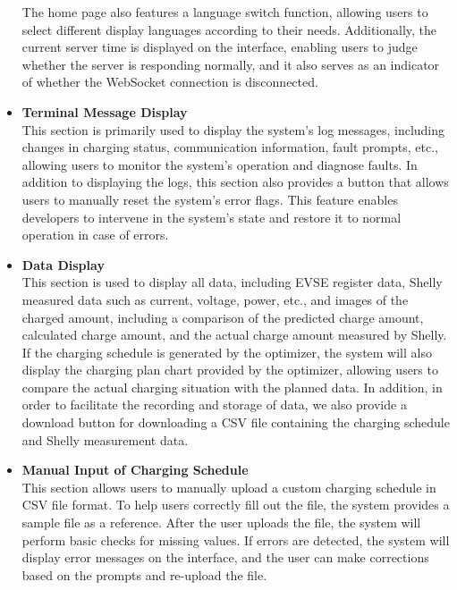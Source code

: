 \documentclass[
	english,
	ruledheaders=section,%
	class=report,%
	thesis={type=Report},%
	accentcolor=9c,%
	custommargins=true,%
	marginpar=false,%
	parskip=half-,%
	fontsize=11pt,%
	logofile={img/tuda_logo.pdf}, %
]{tudapub}
\begin{document}
\begin{itemize}
The home page also features a language switch function, allowing users to select different display languages according to their needs. Additionally, the current server time is displayed on the interface, enabling users to judge whether the server is responding normally, and it also serves as an indicator of whether the WebSocket connection is disconnected.

    \item \textbf{Terminal Message Display}\\
    This section is primarily used to display the system's log messages, including changes in charging status, communication information, fault prompts, etc., allowing users to monitor the system's operation and diagnose faults. In addition to displaying the logs, this section also provides a button that allows users to manually reset the system's error flags. This feature enables developers to intervene in the system's state and restore it to normal operation in case of errors.
    \item \textbf{Data Display}\\
    This section is used to display all data, including EVSE register data, Shelly measured data such as current, voltage, power, etc., and images of the charged amount, including a comparison of the predicted charge amount, calculated charge amount, and the actual charge amount measured by Shelly. If the charging schedule is generated by the optimizer, the system will also display the charging plan chart provided by the optimizer, allowing users to compare the actual charging situation with the planned data. In addition, in order to facilitate the recording and storage of data, we also provide a download button for downloading a CSV file containing the charging schedule and Shelly measurement data.
    \item \textbf{Manual Input of Charging Schedule}\\
    This section allows users to manually upload a custom charging schedule in CSV file format. To help users correctly fill out the file, the system provides a sample file as a reference. After the user uploads the file, the system will perform basic checks for missing values. If errors are detected, the system will display error messages on the interface, and the user can make corrections based on the prompts and re-upload the file.
\end{itemize}

\end{document}
